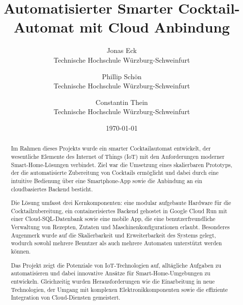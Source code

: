\documentclass[a4paper, 12pt]{article} %
\title{Automatisierter Smarter Cocktail-Automat mit Cloud Anbindung}
\author{ 
  Jonas Eck \\
	Technische Hochschule Würzburg-Schweinfurt\\
	\and 
	Phillip Schön \\
	Technische Hochschule Würzburg-Schweinfurt\\
	\and 
  Constantin Thein\\
	Technische Hochschule Würzburg-Schweinfurt\\
	}
\date{\today}
\begin{document}
\maketitle
\newpage
\tableofcontents
\newpage

\begin{abstract}
Im Rahmen dieses Projekts wurde ein smarter Cocktailautomat entwickelt, der wesentliche Elemente des
Internet of Things (IoT) mit den Anforderungen moderner Smart-Home-Lösungen verbindet. Ziel war die
Umsetzung eines skalierbaren Prototyps, der die automatisierte Zubereitung von Cocktails ermöglicht 
und dabei durch eine intuitive Bedienung über eine Smartphone-App sowie die Anbindung an ein 
cloudbasiertes Backend besticht.

Die Lösung umfasst drei Kernkomponenten: eine modular aufgebaute Hardware für die 
Cocktailzubereitung, ein containerisiertes Backend gehostet in Google Cloud Run mit einer 
Cloud-SQL-Datenbank sowie eine mobile App, die eine benutzerfreundliche Verwaltung von Rezepten, 
Zutaten und Maschinenkonfigurationen erlaubt. Besonderes Augenmerk wurde auf die Skalierbarkeit und 
Erweiterbarkeit des Systems gelegt, wodurch sowohl mehrere Benutzer als auch mehrere Automaten 
unterstützt werden können.

Das Projekt zeigt die Potenziale von IoT-Technologien auf, alltägliche Aufgaben zu automatisieren 
und dabei innovative Ansätze für Smart-Home-Umgebungen zu entwickeln. Gleichzeitig wurden 
Herausforderungen wie die Einarbeitung in neue Technologien, der Umgang mit komplexen 
Elektronikkomponenten sowie die effiziente Integration von Cloud-Diensten gemeistert.
\end{abstract}


\end{document}
